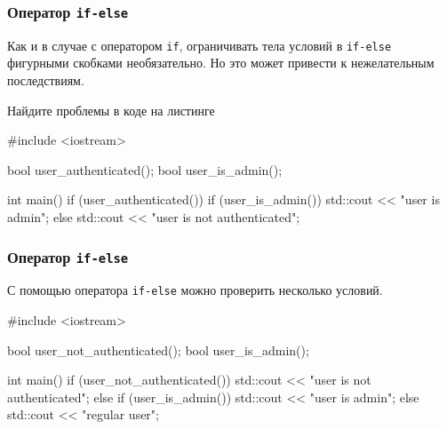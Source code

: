 \documentclass[compress, 8pt]{beamer}
\begin{document}
\begin{frame}[fragile]

    \frametitle{Оператор \texttt{if-else}}

    Как и в случае с оператором \verb|if|, ограничивать
    тела условий в \verb|if-else| фигурными скобками необязательно.
    Но это может привести к нежелательным последствиям.

    \begin{task}
        Найдите проблемы в коде на листинге
    \end{task}

    \begin{myinplacelisting}[minted language=cpp]
#include <iostream>

bool user_authenticated();
bool user_is_admin();

int main() {
    if (user_authenticated())
        if (user_is_admin())
            std::cout << "user is admin\n";
    else
        std::cout << "user is not authenticated\n";
}
    \end{myinplacelisting}

\end{frame}

\begin{frame}[fragile]

    \frametitle{Оператор \texttt{if-else}}

    С помощью оператора \verb|if-else| можно проверить несколько условий.

    \begin{myinplacelisting}[minted language=cpp]
#include <iostream>

bool user_not_authenticated();
bool user_is_admin();

int main() {
    if (user_not_authenticated()) {
        std::cout << "user is not authenticated\n";
    }
    else if (user_is_admin()) {
        std::cout << "user is admin\n";
    }
    else {
        std::cout << "regular user\n";
    }
}
    \end{myinplacelisting}

\end{frame}
\end{document}
